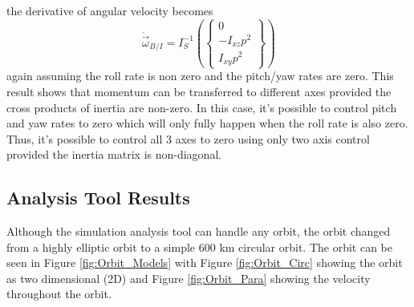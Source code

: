 \documentclass[conf]{new-aiaa}
\begin{document}
the derivative of angular velocity becomes
\begin{equation}
  \dot{\vec{\omega}}_{B/I} = I_S^{-1} \left (\begin{Bmatrix} 0
    \\ -I_{xz}p^2 \\ I_{xy}p^2 \end{Bmatrix} \right )
\end{equation}
again assuming the roll rate is non zero and the pitch/yaw rates are
zero. This result shows that momentum can be transferred to different
axes provided the cross products of inertia are non-zero. In this case, it's possible to control pitch and yaw rates to zero which will only fully happen when the roll rate is also zero. Thus, it's possible to control all 3 axes to zero using only two axis control provided the inertia matrix is non-diagonal.

\subsection{Analysis Tool Results}
Although the simulation analysis tool can handle any orbit, the orbit changed from a highly elliptic orbit to a simple 600 km circular orbit. The orbit can be seen in Figure \ref{fig:Orbit_Models} with Figure \ref{fig:Orbit_Circ} showing the orbit as two dimensional (2D) and Figure \ref{fig:Orbit_Para} showing the velocity throughout the orbit.
\end{document}
